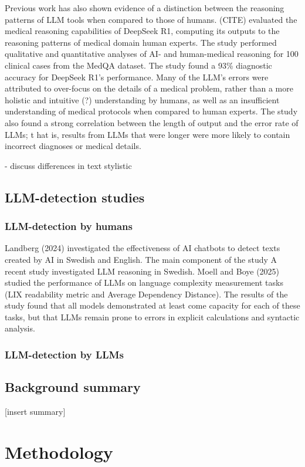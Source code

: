 \documentclass[thesis]{cluu}
\begin{document}
Previous work has also shown evidence of a distinction between
the reasoning patterns of LLM tools when compared to those of
humans. (CITE) evaluated the medical reasoning capabilities of
DeepSeek R1, computing its outputs to the reasoning patterns of
medical domain human experts. The study performed qualitative
and quantitative analyses of AI- and human-medical reasoning for
100 clinical cases from the MedQA dataset. The study found a
93\% diagnostic accuracy for DeepSeek R1's performance. Many of
the LLM's errors were attributed to over-focus on the details of
a medical problem, rather than a more holistic and intuitive (?)
understanding by humans, as well as an insufficient
understanding of medical protocols when compared to human
experts. The study also found a strong correlation between the
length of output and the error rate of LLMs; t hat is, results
from LLMs that were longer were more likely to contain incorrect
diagnoses or medical details.

- discuss differences in text stylistic 


\section{LLM-detection studies}

\subsection{LLM-detection by humans}
Landberg (2024) investigated the effectiveness of AI chatbots to
detect texts created by AI in Swedish and English. The main
component of the study A recent study investigated LLM reasoning
in Swedish. Moell and Boye (2025) studied the performance of
LLMs on language complexity measurement tasks (LIX readability
metric and Average Dependency Distance). The results of the
study found that all models demonstrated at least come capacity
for each of these tasks, but that LLMs remain prone to errors in
explicit calculations and syntactic analysis.
\subsection{LLM-detection by LLMs}


\section{Background summary}

[insert summary]

\chapter{Methodology}
\end{document}
